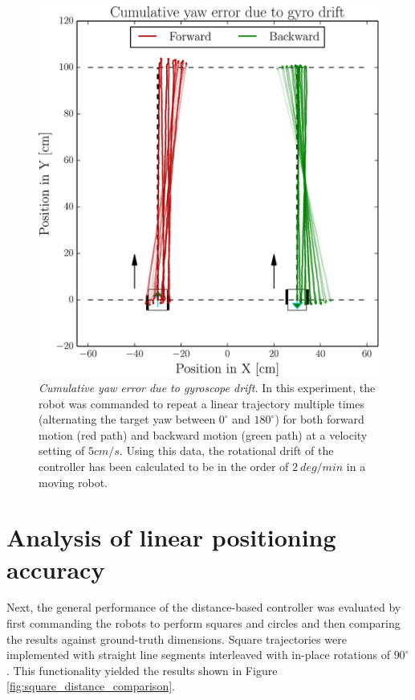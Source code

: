 \documentclass[12pt,twoside]{report}
\begin{document}
\begin{figure}[hbtp]
\centerline{\includegraphics[width=0.55\linewidth]{cumulative_yaw_error}}
\vspace{-2.5mm}
\caption[Cumulative yaw error due to gyroscope drift]{\emph{Cumulative yaw error due to gyroscope drift.}
In this experiment, the robot was commanded to repeat a linear trajectory multiple times (alternating the target yaw between $0^{\circ}$ and $180^{\circ}$) for both forward motion (red path) and backward motion (green path)
at a velocity setting of $5cm/s$.
Using this data, the rotational drift of the controller has been calculated to be in the order of $2\ deg/min$ in a moving robot.
}
\label{fig:cumulative_yaw_error}
\end{figure}




\section{Analysis of linear positioning accuracy} \label{sec:sect32}

Next, the general performance of the distance-based controller was evaluated by first commanding the robots to perform squares and circles and then comparing the results against ground-truth dimensions.
Square trajectories were implemented with straight line segments interleaved with in-place rotations of $90^{\circ}$. This functionality yielded the results shown in Figure \ref{fig:square_distance_comparison}.
\end{document}
